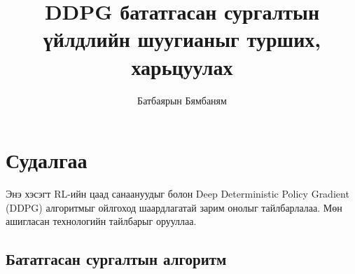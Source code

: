 \documentclass[12pt,A4]{report}
\begin{document}

\title{DDPG бататгасан сургалтын үйлдлийн шуугианыг турших, харьцуулах }
\author{Батбаярын Бямбаням}
\cosupervisor{}








\chapter{Судалгаа}

Энэ хэсэгт RL-ийн цаад санаануудыг болон Deep Deterministic Policy Gradient (DDPG) алгоритмыг ойлгоход шаардлагатай зарим онолыг тайлбарлалаа. Мөн ашигласан технологийн тайлбарыг орууллаа.

\section{Бататгасан сургалтын алгоритм}
\end{document}
